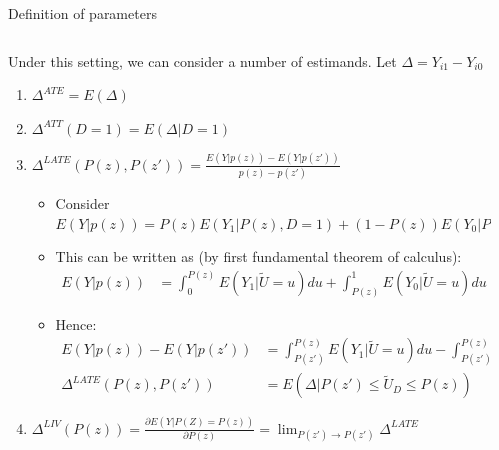 \documentclass[notes,11pt, aspectratio=169]{beamer}
\newenvironment{wideitemize}{\itemize\addtolength{\itemsep}{10pt}}{\enditemize}
\begin{document}
\begin{frame}{Definition of parameters}
  \begin{columns}[T] %
    \begin{column}{0.95\textwidth}
      \begin{wideitemize}
      \item Under this setting, we can consider a number of estimands. Let $\Delta = Y_{i1} - Y_{i0}$
        \begin{enumerate}
        \item $\Delta^{ATE} = E(\Delta)$
        \item $\Delta^{ATT}(D = 1) = E(\Delta | D = 1)$
        \item $\Delta^{LATE}(P(z), P(z')) = \frac{E(Y| p(z)) - E(Y| p(z'))}{p(z) - p(z')}$
          \begin{itemize}
          \item Consider $E(Y | p(z)) = P(z) E(Y_{1} | P(z), D = 1) + (1-  P(z)) E(Y_{0} | P(z), D = 0)$
          \item This can be written as (by first fundamental theorem of calculus):
            \begin{align*}
              E(Y | p(z)) &= \int_{0}^{P(z)}E(Y_{1} | \widetilde{U} = u) du + \int_{P(z)}^{1}E(Y_{0} | \widetilde{U} = u) du
            \end{align*}
          \item Hence:
            \begin{align*}
              E(Y | p(z)) - E(Y | p(z'))  &= \int_{P(z')}^{P(z)}E(Y_{1} | \widetilde{U} = u) du -  \int_{P(z')}^{P(z)}E(Y_{0} | \widetilde{U} = u) du\\
              \Delta^{LATE}(P(z), P(z')) &= E(\Delta | P(z') \leq \widetilde{U}_{D} \leq P(z))
            \end{align*}

          \end{itemize}
        \item $\Delta^{LIV}(P(z)) = \frac{\partial E(Y | P(Z) = P(z))}{\partial P(z)} = \lim_{P(z') \rightarrow P(z')} \Delta^{LATE}$
        \end{enumerate}
      \end{wideitemize}
\end{column}
\begin{column}{0.4\textwidth}
\end{column}
\end{columns}
\end{frame}
\end{document}
